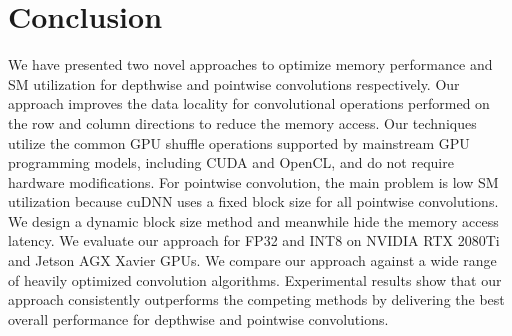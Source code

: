 \section{Conclusion}
We have presented two novel approaches to optimize memory performance and SM utilization for depthwise and pointwise convolutions respectively. 
Our approach improves the data locality for convolutional operations performed on the row and column directions to reduce the memory access. 
Our techniques utilize the common GPU shuffle operations supported by mainstream GPU programming models, including CUDA and OpenCL, and do not require hardware modifications.
For pointwise convolution, the main problem is low SM utilization because cuDNN uses a fixed block size for all pointwise convolutions. We design a dynamic block size method and meanwhile hide the memory access latency. 
We evaluate our approach for FP32 and INT8 on NVIDIA RTX 2080Ti and Jetson AGX Xavier GPUs. 
We compare our approach against a wide range of heavily optimized convolution algorithms. 
Experimental results show that our approach consistently outperforms the competing methods by delivering the best overall performance for depthwise and pointwise convolutions.




